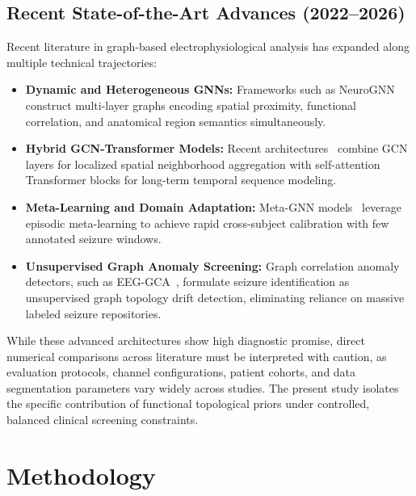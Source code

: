 \documentclass[journal]{IEEEtran}
\begin{document}
\subsection{Recent State-of-the-Art Advances (2022--2026)}
Recent literature in graph-based electrophysiological analysis has expanded along multiple technical trajectories:
\begin{itemize}
    \item \textbf{Dynamic and Heterogeneous GNNs:} Frameworks such as NeuroGNN~\cite{neurognn2024} construct multi-layer graphs encoding spatial proximity, functional correlation, and anatomical region semantics simultaneously.
    \item \textbf{Hybrid GCN-Transformer Models:} Recent architectures~\cite{gcntrans2024} combine GCN layers for localized spatial neighborhood aggregation with self-attention Transformer blocks for long-term temporal sequence modeling.
    \item \textbf{Meta-Learning and Domain Adaptation:} Meta-GNN models~\cite{metagnn2024} leverage episodic meta-learning to achieve rapid cross-subject calibration with few annotated seizure windows.
    \item \textbf{Unsupervised Graph Anomaly Screening:} Graph correlation anomaly detectors, such as EEG-GCA~\cite{eeggca2025}, formulate seizure identification as unsupervised graph topology drift detection, eliminating reliance on massive labeled seizure repositories.
\end{itemize}

While these advanced architectures show high diagnostic promise, direct numerical comparisons across literature must be interpreted with caution, as evaluation protocols, channel configurations, patient cohorts, and data segmentation parameters vary widely across studies. The present study isolates the specific contribution of functional topological priors under controlled, balanced clinical screening constraints.

\section{Methodology}
\end{document}
